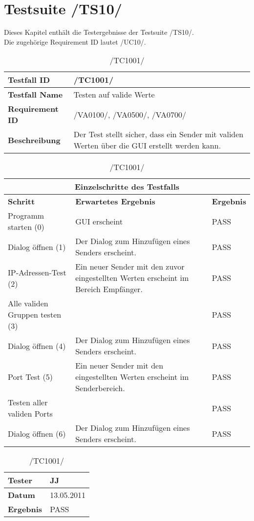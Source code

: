 \chapter{Testsuite /TS10/}
Dieses Kapitel enthält die Testergebnisse der Testsuite /TS10/.\\
Die zugehörige Requirement ID lautet /UC10/.

\begin{table}[h]
\caption{/TC1001/}
\label{tab:TC1001}
\begin{center}
\begin{tabular}{|p{3.5cm}|p{11cm}|}
\hline
\textbf{Testfall ID} & /TC1001/\\
\hline
\textbf{Testfall Name} & Testen auf valide Werte\\
\hline
\textbf{Requirement ID} & /VA0100/, /VA0500/, /VA0700/\\
\hline
\textbf{Beschreibung} & Der Test stellt sicher, dass ein Sender mit validen
Werten über die GUI erstellt werden kann. \\
\hline
\end{tabular}
\begin{tabular}{|p{4cm}|p{7.8cm}|p{2.3cm}|}
\multicolumn{3}{|c|}{\textbf{Einzelschritte des Testfalls}} \\
\hline
\textbf{Schritt} & \textbf{Erwartetes Ergebnis} & \textbf{Ergebnis}\\
\hline
Programm starten (0) & GUI erscheint & PASS
 \\
\hline
Dialog öffnen (1) & Der Dialog
 zum Hinzufügen eines Senders erscheint. & PASS
\\
\hline
IP-Adressen-Test (2) & Ein neuer Sender mit den zuvor eingestellten Werten erscheint im Bereich
 Empfänger. & PASS
 \\
\hline
Alle validen Gruppen testen (3) & & PASS
\\
\hline
Dialog öffnen (4) & Der Dialog
 zum Hinzufügen eines Senders erscheint. & PASS
\\
\hline
Port Test (5) & Ein neuer Sender mit den eingestellten Werten erscheint im
 Senderbereich. & PASS
\\
\hline
Testen aller validen Ports & & PASS
\\
\hline
Dialog öffnen (6) & Der Dialog
 zum Hinzufügen eines Senders erscheint. & PASS
\\
\hline
\end{tabular}
\begin{tabular}{|p{3.5cm}|p{11cm}|}
\textbf{Tester} & JJ\\
\hline
\textbf{Datum} & 13.05.2011\\
\hline
\textbf{Ergebnis} & PASS\\
\hline
\end{tabular}
\end{center}
\end{table}


